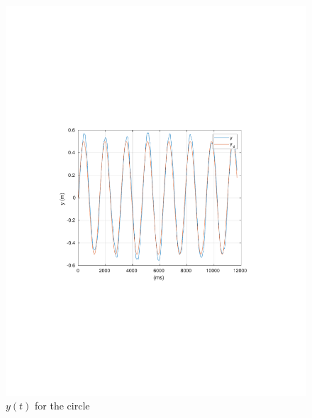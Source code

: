 \begin{frame}
		\begin{figure}[!htb]
			\centering
			\includegraphics[scale=0.7,trim={3.5cm 8cm 4cm 8cm},clip]{figuras/CROB_Fuzzy_vel01_a05_circleXY/y.pdf}
			\caption{$y(t)$ for the circle}
			\label{fig:crob_circ_y}
		\end{figure}
\end{frame}
